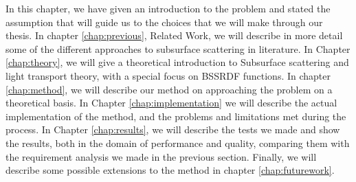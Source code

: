 In this chapter, we have given an introduction to the problem and stated the assumption that will guide us to the choices that we will make through our thesis. In chapter \ref{chap:previous}, Related Work, we will describe in more detail some of the different approaches to subsurface scattering in literature. In Chapter \ref{chap:theory}, we will give a theoretical introduction to Subsurface scattering and light transport theory, with a special focus on BSSRDF functions. In chapter \ref{chap:method}, we will describe our method on approaching the problem on a theoretical basis. In Chapter \ref{chap:implementation} we will describe the actual implementation of the method, and the problems and limitations met during the process. In Chapter \ref{chap:results}, we will describe the tests we made and show the results, both in the domain of performance and quality, comparing them with the requirement analysis we made in the previous section. Finally, we will describe some possible extensions to the method in chapter \ref{chap:futurework}.  

